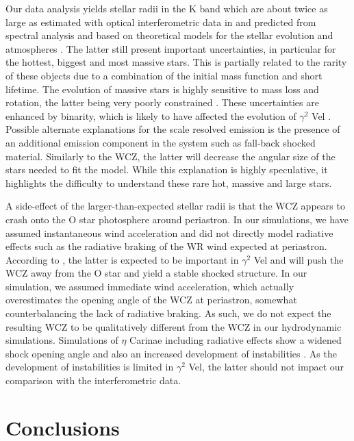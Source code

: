 \documentclass[usenatbib]{mnras}%
\begin{document}
Our data analysis yields stellar radii in the K band which are about twice as large as estimated with optical interferometric data in \citet{2007MNRAS.377..415N} and predicted from spectral analysis and based on theoretical models for the stellar evolution and atmospheres \citet[e.g.][]{1999A&A...345..163D}. The latter still present important uncertainties, in particular for the  hottest, biggest and most massive stars. This is partially related to the rarity of these objects due to a combination of the initial mass function and short lifetime. The evolution of massive stars is highly sensitive to mass loss and rotation, the latter being very poorly constrained \citep{2000A&A...361..159M}. These uncertainties are enhanced by binarity, which is likely to have affected the evolution of $\gamma^2$ Vel \citep{2009MNRAS.400L..20E}.  Possible alternate explanations for the scale resolved emission is the presence of an additional emission component in the system such as fall-back shocked material. Similarly to the WCZ, the latter will  decrease the angular size of the stars needed to fit the model. While this explanation is highly speculative, it highlights the difficulty to understand these rare hot, massive and large stars.

A side-effect of the larger-than-expected stellar radii is that the WCZ appears to crash onto the O star photosphere around periastron. In our simulations, we have assumed instantaneous wind acceleration and did not directly model radiative effects such as the radiative braking of the WR wind expected at periastron. According to \citet{1997ApJ...475..786G,2000MNRAS.316..129R}, the latter is expected to be important in $\gamma^2$ Vel and will push the WCZ away from the O star and yield a stable shocked structure. In our simulation, we assumed immediate wind acceleration, which actually overestimates the opening angle of the WCZ at periastron, somewhat counterbalancing the lack of radiative braking. As such, we do not expect the resulting WCZ to be qualitatively different from the WCZ in our hydrodynamic simulations. Simulations of $\eta$ Carinae including radiative effects show a widened shock opening angle and also an increased development of instabilities \citep{2011ApJ...726..105P}. As the development of instabilities is limited in $\gamma^2$ Vel, the latter should not impact our comparison with the interferometric data. 








\section{Conclusions}\label{sec:conclusion}
\end{document}
